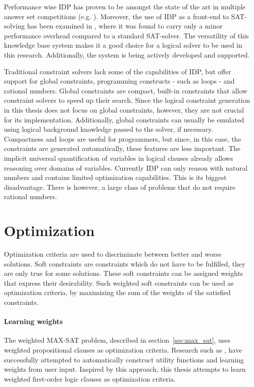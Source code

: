 Performance wise IDP has proven to be amongst the state of the art in multiple answer set competitions (e.g. \cite{calimeri2014third}).
Moreover, the use of IDP as a front-end to SAT-solving has been examined in \cite{bruynooghe2014predicate}, where it was found to carry only a minor performance overhead compared to a standard SAT-solver.
The versatility of this knowledge base system makes it a good choice for a logical solver to be used in this research.
Additionally, the system is being actively developed and supported.

Traditional constraint solvers lack some of the capabilities of IDP, but offer support for global constraints, programming constructs - such as loops - and rational numbers.
Global constraints are compact, built-in constraints that allow constraint solvers to speed up their search.
Since the logical constraint generation in this thesis does not focus on global constraints, however, they are not crucial for its implementation.
Additionally, global constraints can usually be emulated using logical background knowledge passed to the solver, if necessary.
Compactness and loops are useful for programmers, but since, in this case, the constraints are generated automatically, these features are less important.
The implicit universal quantification of variables in logical clauses already allows reasoning over domains of variables.
Currently IDP can only reason with natural numbers and contains limited optimization capabilities.
This is its biggest disadvantage.
There is however, a large class of problems that do not require rational numbers.

\section{Optimization}
Optimization criteria are used to discriminate between better and worse solutions.
Soft constraints are constraints which do not have to be fulfilled, they are only true for some solutions.
These soft constraints can be assigned weights that express their desirability.
Such weighted soft constraints can be used as optimization criteria, by maximizing the sum of the weights of the satisfied constraints.

\paragraph{Learning weights}
The weighted MAX-SAT problem, described in section~\ref{sec:max_sat}, uses weighted propositional clauses as optimization criteria.
Research such as \cite{campigotto2011active}, have successfully attempted to  automatically construct utility functions and learning weights from user input.
Inspired by this approach, this thesis attempts to learn weighted first-order logic clauses as optimization criteria.

